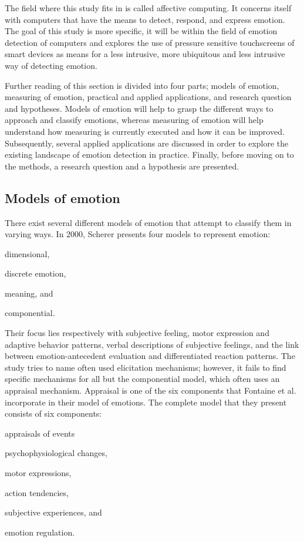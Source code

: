 \documentclass{sigchi}
\begin{document}
The field where this study fits in is called affective computing. It concerns itself with computers that have the means to detect, respond, and express emotion. The goal of this study is more specific, it will be within the field of emotion detection of computers and explores the use of pressure sensitive touchscreens of smart devices as means for a less intrusive, more ubiquitous and less intrusive way of detecting emotion.

Further reading of this section is divided into four parts; models of emotion, measuring of emotion, practical and applied applications, and research question and hypotheses. Models of emotion will help to grasp the different ways to approach and classify emotions, whereas measuring of emotion will help understand how measuring is currently executed and how it can be improved. Subsequently, several applied applications are discussed in order to explore the existing landscape of emotion detection in practice. Finally, before moving on to the methods, a research question and a hypothesis are presented.

\subsection{Models of emotion} %
\label{sub:models_of_emotion}
There exist several different models of emotion that attempt to classify them in varying ways. In 2000, Scherer \cite{scherer2000} presents four models to represent emotion:
\begin{enumerate*}[label=(\alph*)]
  \item dimensional,
  \item discrete emotion,
  \item meaning, and
  \item componential.
\end{enumerate*}
Their focus lies respectively with subjective feeling, motor expression and adaptive behavior patterns, verbal descriptions of subjective feelings, and the link between emotion-antecedent evaluation and differentiated reaction patterns. The study tries to name often used elicitation mechanisms; however, it fails to find specific mechanisms for all but the componential model, which often uses an appraisal mechanism. Appraisal is one of the six components that Fontaine et al. \cite{Fontaine2007} incorporate in their model of emotions. The complete model that they present consists of six components:
\begin{enumerate*}[label=(\alph*)]
  \item appraisals of events
  \item psychophysiological changes,
  \item motor expressions,
  \item action tendencies,
  \item subjective experiences, and
  \item emotion regulation.
\end{enumerate*}
\end{document}
